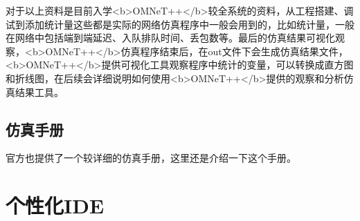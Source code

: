 对于以上资料是目前入学<b>OMNeT++</b>较全系统的资料，从工程搭建、调试到添加统计量这些都是实际的网络仿真程序中一般会用到的，比如统计量，一般在网络中包括端到端延迟、入队排队时间、丢包数等。最后的仿真结果可视化观察，<b>OMNeT++</b>仿真程序结束后，在out文件下会生成仿真结果文件，<b>OMNeT++</b>提供可视化工具观察程序中统计的变量，可以转换成直方图和折线图，在后续会详细说明如何使用<b>OMNeT++</b>提供的观察和分析仿真结果工具。\\

\subsection{仿真手册}
官方也提供了一个较详细的仿真手册，这里还是介绍一下这个手册。\\



\section{个性化IDE}



